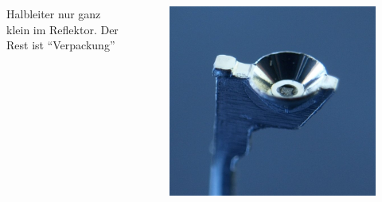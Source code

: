 \begin{frame}
\begin{columns}[c]
    \column{5cm}
    Halbleiter nur ganz klein im Reflektor. Der Rest ist ``Verpackung''\\[1.5em]
    \begin{figure}
      \includegraphics[width=.75\textwidth,height=.6\textheight,keepaspectratio]{e12/Led_reflector.jpg}
    \end{figure}
  \end{columns}
\end{frame}

